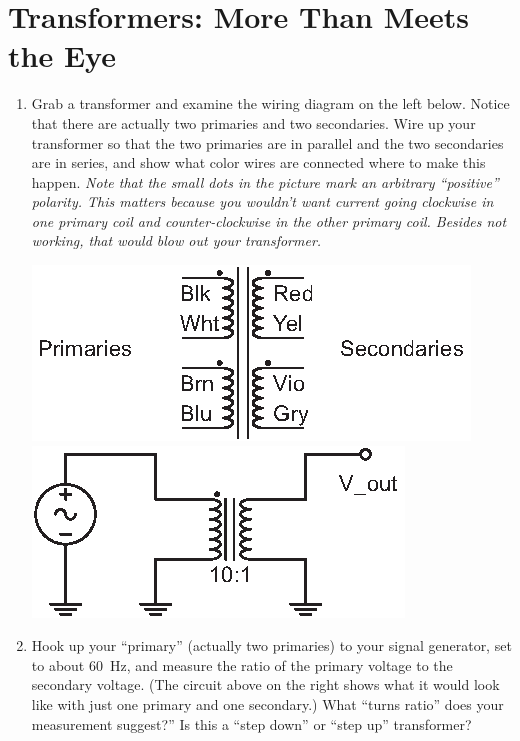 \section{Transformers: More Than Meets the Eye}
\label{lab_transformers}


\bigskip

\begin{enumerate}[wide]

\item Grab a transformer and examine the wiring diagram on the left below.  Notice that there are actually two primaries and two secondaries.  Wire up your transformer so that the two primaries are in parallel and the two secondaries are in series, and show what color wires are connected where to make this happen.  \textit{Note that the small dots in the picture mark an arbitrary ``positive'' polarity.  This matters because you wouldn't want current going clockwise in one primary coil and counter-clockwise in the other primary coil.  Besides not working, that would blow out your transformer.}   

\vspace{-0.2in}
\begin{center}
\includegraphics{transformers/transformer_wiring.eps}
\hspace{0.5in}
\includegraphics{transformers/transformer_wiring2.eps}
\end{center}
\vspace{-0.2in}

\item Hook up your ``primary'' (actually two primaries) to your signal generator, set to about 60~Hz, and measure the ratio of the primary voltage to the secondary voltage.  (The circuit above on the right shows what it would look like with just one primary and one secondary.)  What ``turns ratio'' does your measurement suggest?''  Is this a ``step down'' or ``step up'' transformer? \label{part_turns1}


\end{enumerate}
